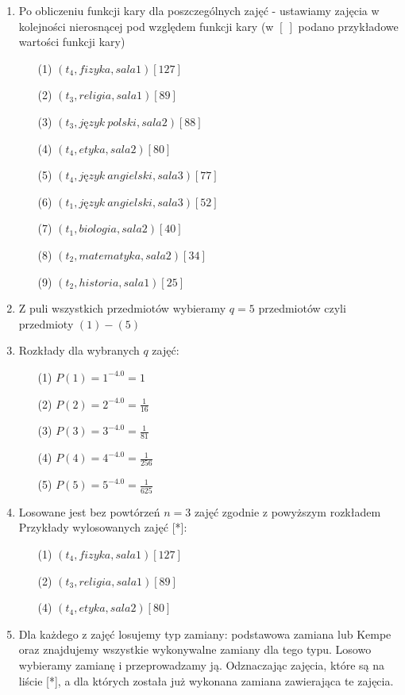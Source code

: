 \begin{enumerate}
\item Po obliczeniu funkcji kary dla poszczególnych zajęć - ustawiamy zajęcia w kolejności nierosnącej pod względem funkcji kary (w $[\ ]$ podano przykładowe wartości funkcji kary)\\
\begin{enumerate}
 \item[(1)] $(t_{4}, fizyka, sala1)[127]$
 \item[(2)] $(t_{3}, religia, sala1)[89]$
 \item[(3)] $(t_{3}, język\ polski, sala2)[88]$
 \item[(4)] $(t_{4}, etyka, sala2)[80]$
 \item[(5)] $(t_{4}, język\ angielski, sala3)[77]$
 \item[(6)] $(t_{1}, język\ angielski, sala3)[52]$
 \item[(7)] $(t_{1}, biologia, sala2)[40]$
 \item[(8)] $(t_{2}, matematyka, sala2)[34]$
 \item[(9)] $(t_{2}, historia, sala1)[25]$
\end{enumerate}
\item Z puli wszystkich przedmiotów wybieramy $q = 5$ przedmiotów czyli przedmioty $(1) - (5)$ 
\item Rozkłady dla wybranych $q$ zajęć:
	\begin{enumerate}
	\item[(1)] $P(1) = 1^{-4.0} = 1$
 	\item[(2)] $P(2) = 2^{-4.0} = \frac{1}{16}$
 	\item[(3)] $P(3) = 3^{-4.0} = \frac{1}{81}$
 	\item[(4)] $P(4) = 4^{-4.0} = \frac{1}{256}$
 	\item[(5)] $P(5) = 5^{-4.0} = \frac{1}{625}$
	\end{enumerate}
\item Losowane jest bez powtórzeń $n = 3$ zajęć zgodnie z powyższym rozkładem \\
	Przykłady wylosowanych zajęć [*]:
	\begin{enumerate}
	 \item[(1)] $(t_{4}, fizyka, sala1)[127]$
	 \item[(2)] $(t_{3}, religia, sala1)[89]$
	  \item[(4)] $(t_{4}, etyka, sala2)[80]$
	\end{enumerate}
\item Dla każdego z zajęć losujemy typ zamiany: podstawowa zamiana lub Kempe oraz znajdujemy wszystkie wykonywalne zamiany dla tego typu. Losowo wybieramy zamianę i przeprowadzamy ją. Odznaczając zajęcia, które są na liście [*], a dla których została już wykonana zamiana zawierająca te zajęcia.
\end{enumerate}




